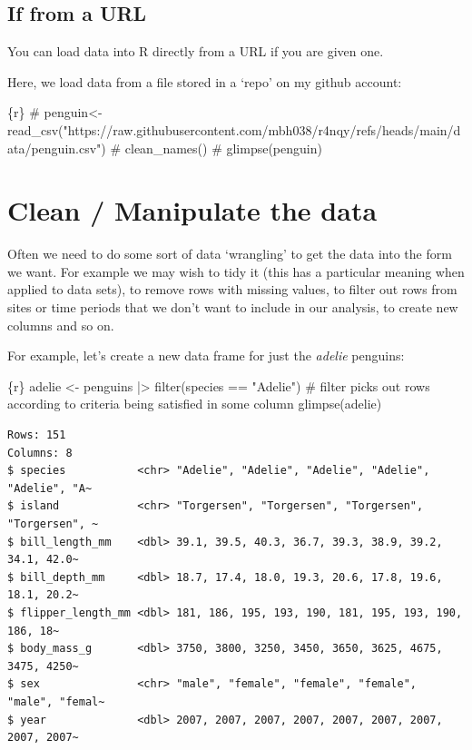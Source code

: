 \documentclass[
  letterpaper,
  DIV=11,
  numbers=noendperiod]{scrreprt}
\newenvironment{Shaded}{\begin{snugshade}}{\end{snugshade}}
\newcommand{\InformationTok}[1]{\textcolor[rgb]{0.37,0.37,0.37}{#1}}
\begin{document}
\subsection{If from a URL}\label{if-from-a-url}

You can load data into R directly from a URL if you are given one.

Here, we load data from a file stored in a `repo' on my github account:

\begin{Shaded}
\begin{Highlighting}[]
\InformationTok{\textasciigrave{}\textasciigrave{}\textasciigrave{}\{r\}}
\InformationTok{\# penguin\textless{}{-}read\_csv("https://raw.githubusercontent.com/mbh038/r4nqy/refs/heads/main/data/penguin.csv")}
\InformationTok{\#   clean\_names()}
\InformationTok{\# glimpse(penguin)}
\InformationTok{\textasciigrave{}\textasciigrave{}\textasciigrave{}}
\end{Highlighting}
\end{Shaded}

\section{Clean / Manipulate the data}\label{clean-manipulate-the-data}

Often we need to do some sort of data `wrangling' to get the data into
the form we want. For example we may wish to tidy it (this has a
particular meaning when applied to data sets), to remove rows with
missing values, to filter out rows from sites or time periods that we
don't want to include in our analysis, to create new columns and so on.

For example, let's create a new data frame for just the \emph{adelie}
penguins:

\begin{Shaded}
\begin{Highlighting}[]
\InformationTok{\textasciigrave{}\textasciigrave{}\textasciigrave{}\{r\}}
\InformationTok{adelie \textless{}{-} penguins |\textgreater{}}
\InformationTok{  filter(species == "Adelie") \# filter picks out rows according to criteria being satisfied in some column}
\InformationTok{glimpse(adelie)}
\InformationTok{\textasciigrave{}\textasciigrave{}\textasciigrave{}}
\end{Highlighting}
\end{Shaded}

\begin{verbatim}
Rows: 151
Columns: 8
$ species           <chr> "Adelie", "Adelie", "Adelie", "Adelie", "Adelie", "A~
$ island            <chr> "Torgersen", "Torgersen", "Torgersen", "Torgersen", ~
$ bill_length_mm    <dbl> 39.1, 39.5, 40.3, 36.7, 39.3, 38.9, 39.2, 34.1, 42.0~
$ bill_depth_mm     <dbl> 18.7, 17.4, 18.0, 19.3, 20.6, 17.8, 19.6, 18.1, 20.2~
$ flipper_length_mm <dbl> 181, 186, 195, 193, 190, 181, 195, 193, 190, 186, 18~
$ body_mass_g       <dbl> 3750, 3800, 3250, 3450, 3650, 3625, 4675, 3475, 4250~
$ sex               <chr> "male", "female", "female", "female", "male", "femal~
$ year              <dbl> 2007, 2007, 2007, 2007, 2007, 2007, 2007, 2007, 2007~
\end{verbatim}
\end{document}
